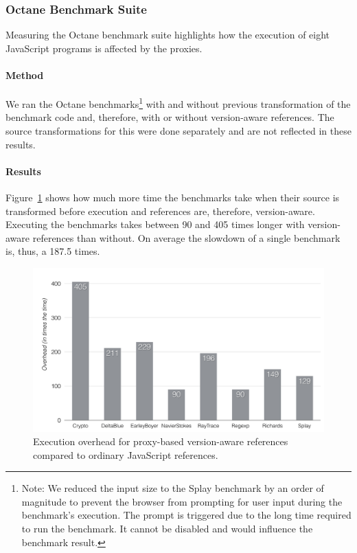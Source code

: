 \subsubsection{Octane Benchmark Suite}

Measuring the Octane benchmark suite highlights how the execution of eight JavaScript programs is affected by the proxies.

\paragraph{Method}
We ran the Octane benchmarks\footnote{Note: We reduced the input size to the Splay benchmark by an order of magnitude to prevent the browser from prompting for user input during the benchmark's execution. The prompt is triggered due to the long time required to run the benchmark. It cannot be disabled and would influence the benchmark result.} with and without previous transformation of the benchmark code and, therefore, with or without version-aware references.
The source transformations for this were done separately and are not reflected in these results.

\paragraph{Results}
Figure~\ref{fig:ExecutionOverhead} shows how much more time the benchmarks take when their source is transformed before execution and references are, therefore, version-aware.
Executing the benchmarks takes between 90 and 405 times longer with version-aware references than without.
On average the slowdown of a single benchmark is, thus, a 187.5 times.

\begin{figure}[h]
    \centering
    \includegraphics[width=\textwidth]{figures/6_evaluation/3_executionOverhead.pdf}
    \caption{Execution overhead for proxy-based version-aware references compared to ordinary JavaScript references.}
    \label{fig:ExecutionOverhead}
\end{figure}


